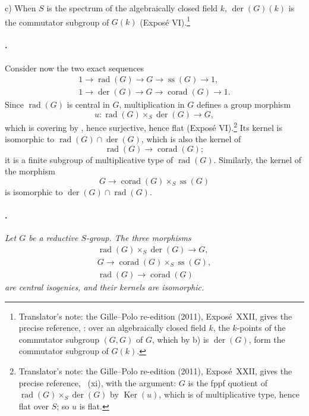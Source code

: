 \textup{c)} When \(S\) is the spectrum of the algebraically closed
field \(k\), \(\operatorname{der}(G)(k)\) is the commutator
subgroup of \(G(k)\) \textup{(Exposé VI)}.\footnote{Translator's note: the Gille--Polo re-edition (2011), Exposé~XXII, gives the
precise reference, : over an algebraically closed field
\(k\), the \(k\)-points of the commutator subgroup \((G,G)\) of \(G\), which
by b) is \(\operatorname{der}(G)\), form the commutator subgroup of
\(G(k)\).}

\paragraph{.}
Consider now the two exact sequences
\[
\begin{gathered}
  1\longrightarrow\operatorname{rad}(G)
  \longrightarrow G
  \longrightarrow\operatorname{ss}(G)
  \longrightarrow 1,\\
  1\longrightarrow\operatorname{der}(G)
  \longrightarrow G
  \longrightarrow\operatorname{corad}(G)
  \longrightarrow 1.
\end{gathered}
\]
Since \(\operatorname{rad}(G)\) is central in \(G\),
multiplication in \(G\) defines a group morphism
\[
  u:\operatorname{rad}(G)\times_S\operatorname{der}(G)
  \longrightarrow G,
\]
which is covering by \textup{}, hence surjective, hence
flat \textup{(Exposé VI)}.\footnote{Translator's note: the Gille--Polo re-edition (2011), Exposé~XXII, gives the precise
reference, ~(xi), with the argument: \(G\) is the fppf
quotient of \(\operatorname{rad}(G)\times_S\operatorname{der}(G)\) by
\(\operatorname{Ker}(u)\), which is of multiplicative type, hence flat over
\(S\); so \(u\) is flat.}
Its kernel is isomorphic to
\(\operatorname{rad}(G)\cap\operatorname{der}(G)\), which is also
the kernel of
\[
  \operatorname{rad}(G)\longrightarrow\operatorname{corad}(G);
\]
it is a finite subgroup of multiplicative type of
\(\operatorname{rad}(G)\). Similarly, the kernel of the morphism
\[
  G\longrightarrow
  \operatorname{corad}(G)\times_S\operatorname{ss}(G)
\]
is isomorphic to
\(\operatorname{der}(G)\cap\operatorname{rad}(G)\).

\paragraph{.}
\textit{Let \(G\) be a reductive \(S\)-group. The three morphisms}
\[
\begin{gathered}
  \operatorname{rad}(G)\times_S\operatorname{der}(G)
    \longrightarrow G,\\
  G\longrightarrow
    \operatorname{corad}(G)\times_S\operatorname{ss}(G),\\
  \operatorname{rad}(G)\longrightarrow\operatorname{corad}(G)
\end{gathered}
\]
\textit{are central isogenies, and their kernels are isomorphic.}

